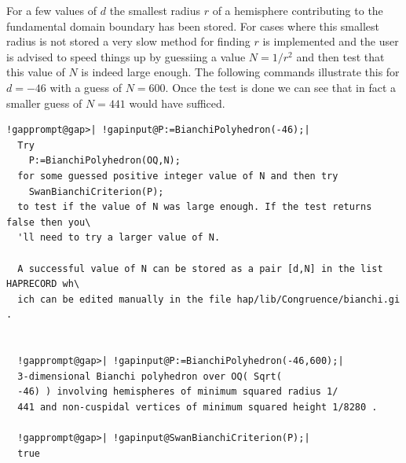 \documentclass[a4paper,11pt]{report}
\begin{document}
{{For a few values of $d$ the smallest radius $r$ of a hemisphere contributing to the fundamental domain boundary has been
stored. For cases where this smallest radius is not stored a very slow method
for finding $r$ is implemented and the user is advised to speed things up by guessiing a value $N=1/r^2$ and then test that this value of $N$ is indeed large enough. The following commands illustrate this for $d=-46$ with a guess of $N=600$. Once the test is done we can see that in fact a smaller guess of $N=441$ would have sufficed. 
\begin{Verbatim}[commandchars=!@|,fontsize=\small,frame=single,label=Example]
  !gapprompt@gap>| !gapinput@P:=BianchiPolyhedron(-46);|
  Try 
    P:=BianchiPolyhedron(OQ,N);
  for some guessed positive integer value of N and then try
    SwanBianchiCriterion(P);
  to test if the value of N was large enough. If the test returns false then you\
  'll need to try a larger value of N.
  
  A successful value of N can be stored as a pair [d,N] in the list HAPRECORD wh\
  ich can be edited manually in the file hap/lib/Congruence/bianchi.gi .
  
  
  !gapprompt@gap>| !gapinput@P:=BianchiPolyhedron(-46,600);|
  3-dimensional Bianchi polyhedron over OQ( Sqrt(
  -46) ) involving hemispheres of minimum squared radius 1/
  441 and non-cuspidal vertices of minimum squared height 1/8280 . 
  
  !gapprompt@gap>| !gapinput@SwanBianchiCriterion(P);|
  true
  
\end{Verbatim}
 }

 
}
\end{document}
